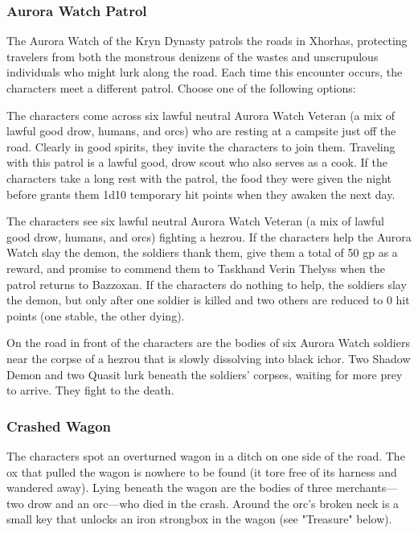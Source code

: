 \documentclass[10pt,a4paper,twoside,twocolumn,openany,nodeprecatedcode]{dndbook}
\begin{document}
\subsubsection{Aurora Watch Patrol}
The Aurora Watch of the Kryn Dynasty patrols the roads in Xhorhas, protecting travelers from both the monstrous denizens of the wastes and unscrupulous individuals who might lurk along the road. Each time this encounter occurs, the characters meet a different patrol. Choose one of the following options:


\begin{description}[nolistsep]
\item[Patrol at Rest.]
The characters come across six lawful neutral Aurora Watch Veteran (a mix of lawful good drow, humans, and orcs) who are resting at a campsite just off the road. Clearly in good spirits, they invite the characters to join them. Traveling with this patrol is a lawful good, drow scout who also serves as a cook. If the characters take a long rest with the patrol, the food they were given the night before grants them 1d10 temporary hit points when they awaken the next day.
\item[Patrol in Battle.]
The characters see six lawful neutral Aurora Watch Veteran (a mix of lawful good drow, humans, and orcs) fighting a hezrou. If the characters help the Aurora Watch slay the demon, the soldiers thank them, give them a total of 50 gp as a reward, and promise to commend them to Taskhand Verin Thelyss when the patrol returns to Bazzoxan. If the characters do nothing to help, the soldiers slay the demon, but only after one soldier is killed and two others are reduced to 0 hit points (one stable, the other dying).
\item[Lost Patrol.]
On the road in front of the characters are the bodies of six Aurora Watch soldiers near the corpse of a hezrou that is slowly dissolving into black ichor. Two Shadow Demon and two Quasit lurk beneath the soldiers' corpses, waiting for more prey to arrive. They fight to the death.
\end{description}

\subsubsection{Crashed Wagon}
The characters spot an overturned wagon in a ditch on one side of the road. The ox that pulled the wagon is nowhere to be found (it tore free of its harness and wandered away). Lying beneath the wagon are the bodies of three merchants—two drow and an orc—who died in the crash. Around the orc's broken neck is a small key that unlocks an iron strongbox in the wagon (see "Treasure" below).
\end{document}

